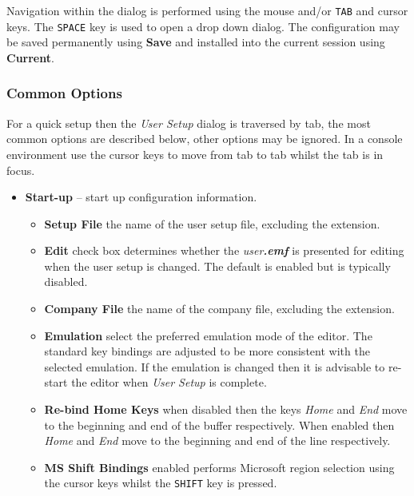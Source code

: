 \documentclass[11pt,a4paper,pdftex]{article}
\begin{document}
  Navigation within the dialog is performed using the mouse and/or
  \texttt{TAB} and cursor keys. The \texttt{SPACE} key is used to open a drop
  down dialog. The configuration may be saved permanently using \textbf{Save}
  and installed into the current session using \textbf{Current}.

\subsubsection{Common Options}

  For a quick setup then the \textit{User Setup} dialog is traversed by tab,
  the most common options are described below, other options may be ignored. 
  In a console environment use the cursor keys to move from tab to tab whilst 
  the tab is in focus.

  \begin{itemize}
    \item \textbf{Start-up} -- start up configuration information.

    \begin{itemize}

      \item \textbf{Setup File} the name of the user setup file, excluding the
      extension.

      \item \textbf{Edit} check box determines whether the
      \textit{user\textbf{.emf}} is presented for editing when the user setup
      is changed. The default is enabled but is typically disabled.

      \item \textbf{Company File} the name of the company file, excluding the
      extension.

      \item \textbf{Emulation} select the preferred emulation mode of the
      editor. The standard key bindings are adjusted to be more consistent
      with the selected emulation. If the emulation is changed then it is
      advisable to re-start the editor when \textit{User Setup} is complete. 

      \item \textbf{Re-bind Home Keys} when disabled then the keys
      \textit{Home} and \textit{End} move to the beginning and end of the
      buffer respectively. When enabled then \textit{Home} and \textit{End}
      move to the beginning and end of the line respectively.

      \item \textbf{MS Shift Bindings} enabled performs Microsoft region
      selection using the cursor keys whilst the \texttt{SHIFT} key is
      pressed.


\end{itemize}
\end{itemize}
\end{document}
